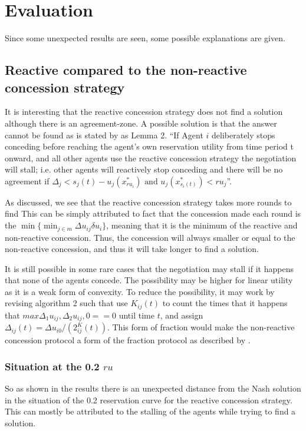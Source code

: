 \clearpage
\section{Evaluation}
Since some unexpected results are seen, some possible explanations are given.
\subsection{Reactive compared to the non-reactive concession strategy}
It is interesting that the reactive concession strategy does not find a solution although there is an agreement-zone. 
A possible solution is that the answer cannot be found as is stated by \citet{zheng2015automated} as Lemma 2. ``If Agent $i$ deliberately stops conceding before reaching the agent's own reservation utility from time period t onward, and all other agents use the reactive concession strategy the negotiation will stall; i.e. other agents will reactively stop conceding and there will be no agreement if $\Delta_j < s_j(t)-u_j(x^*_{ru_i}) \text{ and } u_j(x^*_{s_i(t)})<ru_j$''.

As discussed, we see that the reactive concession strategy takes more rounds to find  This can be simply attributed to fact that the concession made each round is the $\displaystyle \min\{ \min_{j \in m}\Delta u_{ij} \delta u_i\}$, meaning that it is the minimum of the reactive and non-reactive concession. Thus, the concession will always smaller or equal to the non-reactive concession, and thus it will take longer to find a solution.

It is still possible in some rare cases that the negotiation may stall if it happens that none of the agents concede. The possibility may be higher for linear utility as it is a weak form of convexity. To reduce the possibility, it may work by revising algorithm 2 such that use $K_{ij}(t)$ to count the times that it happens that $max{ \Delta_1 u_{ij},\Delta_2 u_{ij}, 0 } == 0$ until time $t$, and assign $\Delta_{ij}(t) =  \Delta u_{i0}/(2^K_{ij}(t))$. This form of fraction would make the non-reactive concession protocol a form of the fraction protocol as described by \citet{wu2009efficient}.

\subsubsection{Situation at the 0.2 $ru$}
So as shown in the results there is an unexpected distance from the Nash solution in the situation of the 0.2 reservation curve for the reactive concession strategy. This can mostly be attributed to the stalling of the agents while trying to find a solution.

